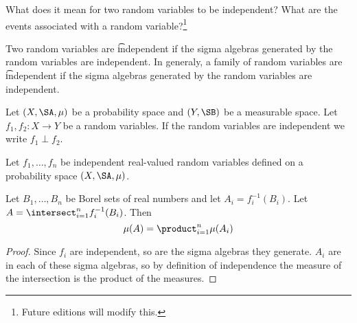 

What does it mean for
two random variables to
be independent?
What are the events associated
with a random variable?\footnote{Future editions will modify this.}


Two random variables are \t{independent} if the sigma algebras generated by the random variables are independent.
In generaly, a family of random variables are \t{independent} if the sigma algebras generated by the random variables are independent.


Let $(X, \SA, \mu)$ be a probability
space and $(Y, \SB)$ be a measurable
space.
Let $f_1,f_2: X \to Y$ be a random variables.
If the random variables are independent
we write $f_1 \perp f_2$.


\begin{prop}
Let $f_1, \dots, f_n$
be independent real-valued
random variables
defined on a probability
space $(X, \SA, \mu)$.

Let $B_1, \dots, B_n$
be Borel sets of
real numbers
and let $A_i = f_i^{-1}(B_i)$.
Let $A = \intersect_{i = 1}^{n} f_i^{-1}(B_i)$.
Then
\[
  \mu(A)
  = \product_{i = 1}^{n} \mu(A_i)
\]
  \begin{proof}
    Since $f_i$ are independent, so
    are the sigma algebras they generate.
    $A_i$ are in each of these sigma
    algebras, so by definition of
    independence the measure of
    the intersection
    is the product of the measures.
  \end{proof}
\end{prop}
